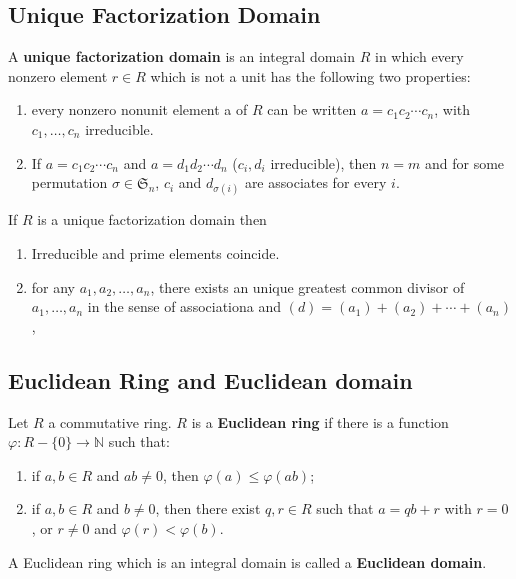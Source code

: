 \subsection{Unique Factorization Domain}
\begin{definition}
    A \textbf{unique factorization domain} is an integral domain $R$ in which every nonzero element $r \in R$ which is not a unit has the following two properties:

    \begin{enumerate}[label=(\roman*)]
        \item
              every nonzero nonunit element a of $R$ can be written $a=c_1 c_2 \cdots c_{n}$, with $c_1, \ldots, c_{n}$ irreducible.
        \item
              If $a=c_1 c_2 \cdots c_{n}$ and $a=d_1 d_2 \cdots d_{n}$ ($c_{i}, d_{i}$ irreducible), then $n=m$ and for some permutation $\sigma\in \mathfrak{S}_n$,
              $c_{i}$ and $d_{\sigma(i)}$ are associates for every $i$.
    \end{enumerate}
\end{definition}
\begin{proposition}
    \label{pro: unique factorization domain}
    If $R$ is a unique factorization domain then

    \begin{enumerate}
        \item
              Irreducible and prime elements coincide.
        \item
              for any $a_1,a_2,\ldots,a_n$, there exists an unique greatest common divisor of $a_1, \ldots, a_{n}$ in the sense of associationa and $\left(d\right)=\left(a_1\right)+\left(a_2\right)+\cdots+\left(a_n\right)$,
    \end{enumerate}
\end{proposition}



\subsection{Euclidean Ring and Euclidean domain} %

\begin{definition}
    Let $R$ a commutative ring. $R$ is a \textbf{Euclidean ring} if there is a function $\varphi: R-\{0\} \rightarrow \mathbb{N}$ such that:
    \begin{enumerate}[label=(\roman*)]
        \item  if $a, b \in R$ and $ab \neq 0$, then $\varphi(a) \leq \varphi(ab)$;
        \item if $a, b \in R$ and $b \neq 0$, then there exist $q, r \in R$ such that $a=qb+r$ with $r=0$, or $r \neq 0$ and $\varphi(r)<\varphi(b)$.
    \end{enumerate}
    A Euclidean ring which is an integral domain is called a \textbf{Euclidean domain}.
\end{definition}

